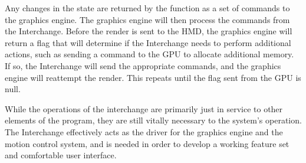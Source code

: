 \documentclass[onecolumn, draftclsnofoot,10pt, compsoc]{IEEEtran}
\begin{document}
Any changes in the state are returned by the function as a set of commands to the graphics engine. The graphics engine will then process the commands from the Interchange. Before the render is sent to the HMD, the graphics engine will return a flag that will determine if the Interchange needs to perform additional actions, such as sending a command to the GPU to allocate additional memory. If so, the Interchange will send the appropriate commands, and the graphics engine will reattempt the render. This repeats until the flag sent from the GPU is null. 

While the operations of the interchange are primarily just in service to other elements of the program, they are still vitally necessary to the system’s operation. The Interchange effectively acts as the driver for the graphics engine and the motion control system, and is needed in order to develop a working feature set and comfortable user interface.
\end{document}

